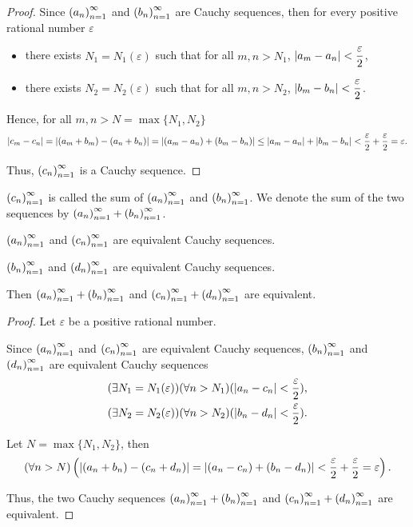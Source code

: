 \begin{proof}
    Since ${\left({a_{n}}\right)}^{\infty}_{n=1}$ and ${\left({b_{n}}\right)}^{\infty}_{n=1}$ are Cauchy sequences, then for every positive rational number $\varepsilon$
    \begin{itemize}[itemsep=0pt]
        \item there exists $N_{1} = N_{1}(\varepsilon)$ such that for all $m, n > N_{1}$, $\left\vert{a_{m} - a_{n}}\right\vert < \dfrac{\varepsilon}{2}$,
        \item there exists $N_{2} = N_{2}(\varepsilon)$ such that for all $m, n > N_{2}$, $\left\vert{b_{m} - b_{n}}\right\vert < \dfrac{\varepsilon}{2}$.
    \end{itemize}

    Hence, for all $m, n > N = \max\{N_{1}, N_{2}\}$
    \[
        \left\vert{c_{m} - c_{n}}\right\vert = \left\vert{(a_{m} + b_{m}) - (a_{n} + b_{n})}\right\vert = \left\vert{(a_{m} - a_{n}) + (b_{m} - b_{n})}\right\vert\le \left\vert{a_{m} - a_{n}}\right\vert + \left\vert{b_{m} - b_{n}}\right\vert < \frac{\varepsilon}{2} + \frac{\varepsilon}{2} = \varepsilon.
    \]

    Thus, ${\left({c_{n}}\right)}^{\infty}_{n=1}$ is a Cauchy sequence.
\end{proof}

${\left({c_{n}}\right)}^{\infty}_{n=1}$ is called the sum of ${\left({a_{n}}\right)}^{\infty}_{n=1}$ and ${\left({b_{n}}\right)}^{\infty}_{n=1}$. We denote the sum of the two sequences by ${\left({a_{n}}\right)}^{\infty}_{n=1} + {\left({b_{n}}\right)}^{\infty}_{n=1}$.

\begin{theorem}
    ${\left({a_{n}}\right)}^{\infty}_{n=1}$ and ${\left({c_{n}}\right)}^{\infty}_{n=1}$ are equivalent Cauchy sequences.

    ${\left({b_{n}}\right)}^{\infty}_{n=1}$ and ${\left({d_{n}}\right)}^{\infty}_{n=1}$ are equivalent Cauchy sequences.

    Then ${\left({a_{n}}\right)}^{\infty}_{n=1} + {\left({b_{n}}\right)}^{\infty}_{n=1}$ and ${\left({c_{n}}\right)}^{\infty}_{n=1} + {\left({d_{n}}\right)}^{\infty}_{n=1}$ are equivalent.
\end{theorem}

\begin{proof}
    Let $\varepsilon$ be a positive rational number.

    Since ${\left({a_{n}}\right)}^{\infty}_{n=1}$ and ${\left({c_{n}}\right)}^{\infty}_{n=1}$ are equivalent Cauchy sequences, ${\left({b_{n}}\right)}^{\infty}_{n=1}$ and ${\left({d_{n}}\right)}^{\infty}_{n=1}$ are equivalent Cauchy sequences
    \[
        \begin{split}
            (\exists N_{1} = N_{1}(\varepsilon))(\forall n > N_{1})(\left\vert{a_{n} - c_{n}}\right\vert < \frac{\varepsilon}{2}), \\
            (\exists N_{2} = N_{2}(\varepsilon))(\forall n > N_{2})(\left\vert{b_{n} - d_{n}}\right\vert < \frac{\varepsilon}{2}).
        \end{split}
    \]

    Let $N = \max\{ N_{1}, N_{2} \}$, then
    \[
        (\forall n > N)\left(\left\vert{(a_{n} + b_{n}) - (c_{n} + d_{n})}\right\vert = \left\vert{(a_{n} - c_{n}) + (b_{n} - d_{n})}\right\vert < \frac{\varepsilon}{2} + \frac{\varepsilon}{2} = \varepsilon\right).
    \]

    Thus, the two Cauchy sequences ${\left({a_{n}}\right)}^{\infty}_{n=1} + {\left({b_{n}}\right)}^{\infty}_{n=1}$ and ${\left({c_{n}}\right)}^{\infty}_{n=1} + {\left({d_{n}}\right)}^{\infty}_{n=1}$ are equivalent.
\end{proof}

